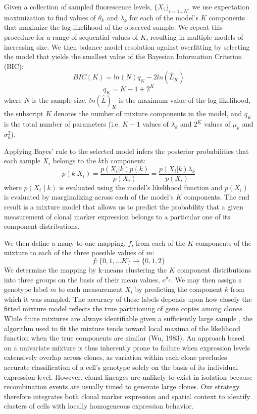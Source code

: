Given a collection of sampled fluorescence levels, $\{X_i\}_{i=1 \ldots N}$, we use expectation maximization to find values of $\theta_k$ and $\lambda_k$ for each of the model's $K$ components that maximize the log-likelihood of the observed sample. We repeat this procedure for a range of sequential values of $K$, resulting in multiple models of increasing size. We then balance model resolution against overfitting by selecting the model that yields the smallest value of the Bayesian Information Criterion (BIC):
\begin{equation}
BIC(K) = ln(N)q_K - 2 ln(\hat{L}_K)
\end{equation}
\begin{equation}
q_K = K-1 + 2^K
\end{equation}
where $N$ is the sample size, $ln(\hat{L})_K$ is the maximum value of the log-likelihood, the subscript $K$ denotes the number of mixture components in the model, and $q_K$ is the total number of parameters (i.e. $K-1$ values of $\lambda_k$ and $2^K$ values of $\mu_k$ and $\sigma_k^2$).

Applying Bayes' rule to the selected model infers the posterior probabilities that each sample $X_i$ belongs to the $k$th component:
\begin{equation}
p(k|X_i) = \frac{p(X_i | k) p(k)}{p(X_i)} = \frac{p(X_i | k) \lambda_k}{p(X_i)}
\end{equation}
where $p(X_i \mid k)$ is evaluated using the model's likelihood function and $p(X_i)$ is evaluated by marginalizing across each of the model's $K$ components. The end result is a mixture model that allows us to predict the probability that a given measurement of clonal marker expression belongs to a particular one of its component distributions.

We then define a many-to-one mapping, $f$, from each of the $K$ components of the mixture to each of the three possible values of $m$:
\begin{equation}
f: \{0,1,...K\} \to \{0,1,2\}
\end{equation}
We determine the mapping by k-means clustering the $K$ component distributions into three groups on the basis of their mean values, $e^{\mu_k}$. We may then assign a genotype label $m$ to each measurement $X_i$ by predicting the component $k$ from which it was sampled. The accuracy of these labels depends upon how closely the fitted mixture model reflects the true partitioning of gene copies among clones. While finite mixtures are always identifiable given a sufficiently large sample \cite{Teicher1963}, the algorithm used to fit the mixture tends toward local maxima of the likelihood function when the true components are similar (Wu, 1983). An approach based on a univariate mixture is thus inherently prone to failure when expression levels extensively overlap across clones, as variation within each clone precludes accurate classification of a cell's genotype solely on the basis of its individual expression level. However, clonal lineages are unlikely to exist in isolation because recombination events are usually timed to generate large clones. Our strategy therefore integrates both clonal marker expression and spatial context to identify clusters of cells with locally homogeneous expression behavior.

